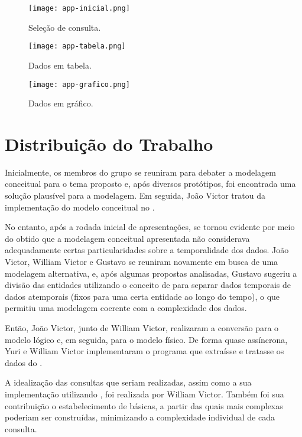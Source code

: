   \begin{figure}[H]
    \centering
    \texttt{[image: app-inicial.png]}
    \caption{Seleção de consulta.}
  \end{figure}

  \begin{figure}[H]
    \centering
    \texttt{[image: app-tabela.png]}
    \caption{Dados em tabela.}
  \end{figure}

  \begin{figure}[H]
    \centering
    \texttt{[image: app-grafico.png]}
    \caption{Dados em gráfico.}
  \end{figure}

\chapter{Distribuição do Trabalho}

   Inicialmente, os membros do grupo se reuniram para debater a modelagem conceitual para o tema proposto e, após diversos
   protótipos, foi encontrada uma solução plausível para a modelagem. Em seguida, João Victor tratou da implementação do
   modelo conceitual no .

   No entanto, após a rodada inicial de apresentações,
   se tornou evidente por meio do  obtido que a modelagem conceitual apresentada não considerava adequadamente
   certas particularidades sobre a temporalidade dos dados. João Victor, William Victor e Gustavo se reuniram novamente em busca de
   uma modelagem alternativa, e, após algumas propostas analisadas, Gustavo sugeriu a divisão das entidades utilizando o conceito
   de  para separar dados temporais de dados atemporais (fixos para uma certa entidade ao longo do tempo),
   o que permitiu uma modelagem coerente com a complexidade dos dados.

   Então, João Victor, junto de William Victor, realizaram a conversão para o modelo lógico e, em seguida, para o modelo
   físico. De forma quase assíncrona, Yuri e William Victor implementaram o programa que extraísse e tratasse os dados do
   .

   A idealização das consultas que seriam realizadas, assim como a sua implementação utilizando  ,
   foi realizada por William Victor. Também foi sua contribuição o estabelecimento de  básicas, a partir das quais
    mais complexas poderiam ser construídas, minimizando a complexidade individual de cada consulta.

